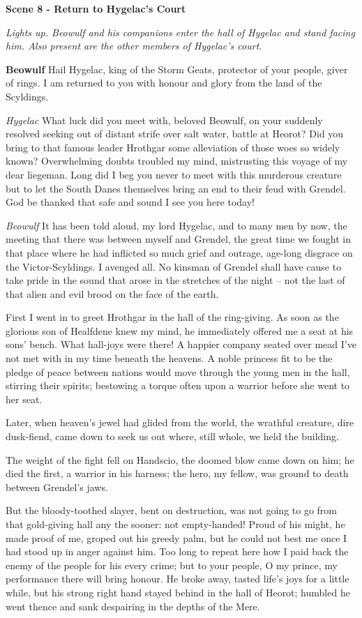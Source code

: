\documentclass[a4paper]{article}
\begin{document}
{\centerline{\textbf{Scene 8 - Return to Hygelac's Court}}
\centerline{\textit{Lights up. Beowulf and his companions enter the hall of Hygelac and stand facing him. Also present are the other members of Hygelac's court.}}

\textbf{Beowulf} Hail Hygelac,
king of the Storm Geats, 
protector of your people, giver of rings.
I am returned to you with honour and glory
from the land of the Scyldings.

\textit{Hygelac} What luck did you meet with, beloved Beowulf,
on your suddenly resolved seeking out
of distant strife over salt water,
battle at Heorot? Did you bring to that famous
leader Hrothgar some alleviation
of those woes so widely known? Overwhelming doubts
troubled my mind, mistrusting this voyage
of my dear liegeman. Long did I beg you
never to meet with this murderous creature
but to let the South Danes themselves bring an end
to their feud with Grendel. God be thanked
that safe and sound I see you here today!

\textit{Beowulf} It has been told aloud, my lord Hygelac,
and to many men by now, the meeting that there was
between myself and Grendel, the great time
we fought in that place where he had inflicted so much
grief and outrage, age-long disgrace
on the Victor-Scyldings. I avenged all.
No kinsman of Grendel shall have cause to take pride
in the sound that arose in the stretches of the night
– not the last of that alien and evil brood
on the face of the earth.

First I went in
to greet Hrothgar in the hall of the ring-giving.
As soon as the glorious son of Healfdene
knew my mind, he immediately
offered me a seat at his sons’ bench.
What hall-joys were there! A happier company
seated over mead I’ve not met with in my time
beneath the heavens. A noble princess
fit to be the pledge of peace between nations
would move through the young men in the hall,
stirring their spirits; bestowing a torque
often upon a warrior before she went to her seat.

Later, when heaven’s jewel
had glided from the world, the wrathful creature,
dire dusk-fiend, came down to seek us out
where, still whole, we held the building.

The weight of the fight fell on Handscio,
the doomed blow came down on him; he died the first,
a warrior in his harness; the hero, my fellow,
was ground to death between Grendel’s jaws.

But the bloody-toothed slayer, bent on destruction,
was not going to go from that gold-giving hall
any the sooner: not empty-handed!
Proud of his might, he made proof of me,
groped out his greedy palm, but he could not best me
once I had stood up in anger against him.
Too long to repeat here how I paid back
the enemy of the people for his every crime;
but to your people, O my prince, my performance there
will bring honour. He broke away,
tasted life’s joys for a little while,
but his strong right hand stayed behind
in the hall of Heorot; humbled he went thence
and sank despairing in the depths of the Mere.

}
\end{document}
